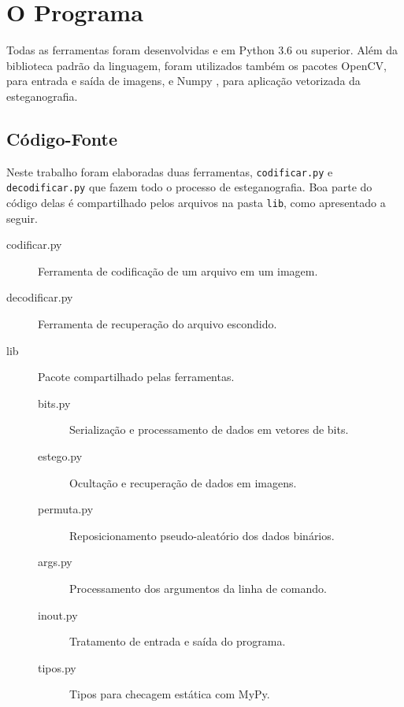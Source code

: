 \section{O Programa}

Todas as ferramentas foram desenvolvidas e  em Python 3.6 ou superior. Além da biblioteca padrão da linguagem, foram utilizados também os pacotes OpenCV, para entrada e saída de imagens, e Numpy , para aplicação vetorizada da esteganografia.

\subsection{Código-Fonte}

    Neste trabalho foram elaboradas duas ferramentas, \texttt{codificar.py} e \texttt{decodificar.py} que fazem todo o processo de esteganografia. Boa parte do código delas é compartilhado pelos arquivos na pasta \texttt{lib}, como apresentado a seguir.

    \begin{description}
        \item[codificar.py] Ferramenta de codificação de um arquivo em um imagem.

        \item[decodificar.py] Ferramenta de recuperação do arquivo escondido.

        \item[lib] Pacote compartilhado pelas ferramentas.

        \begin{description}
            \item[bits.py] Serialização e processamento de dados em vetores de bits.

            \item[estego.py] Ocultação e recuperação de dados em imagens.

            \item[permuta.py] Reposicionamento pseudo-aleatório dos dados binários.

            \item[args.py] Processamento dos argumentos da linha de comando.

            \item[inout.py] Tratamento de entrada e saída do programa.

            \item[tipos.py] Tipos para checagem estática com MyPy.
        \end{description}
    \end{description}

